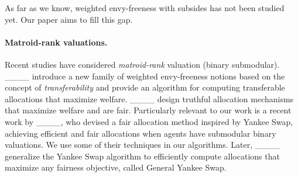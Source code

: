  As far as we know, weighted envy-freeness with subsides has not been studied yet. Our paper aims to fill this gap.
 
 \paragraph{\textbf{Matroid-rank valuations.}}
 Recent studies have considered \emph{matroid-rank} valuation (binary submodular). ____ introduce a new family of weighted envy-freeness notions based on the concept of \emph{transferability} and provide an algorithm for computing transferable allocations that maximize welfare. ____ design truthful allocation mechanisms that maximize welfare and are fair. Particularly relevant to our work is a recent work by ____, who devised a fair allocation method inspired by Yankee Swap, achieving efficient and fair allocations when agents have submodular binary valuations. We use some of their techniques in our algorithms. Later, ____ generalize the Yankee Swap algorithm to efficiently compute allocations that maximize any fairness objective, called General Yankee Swap.